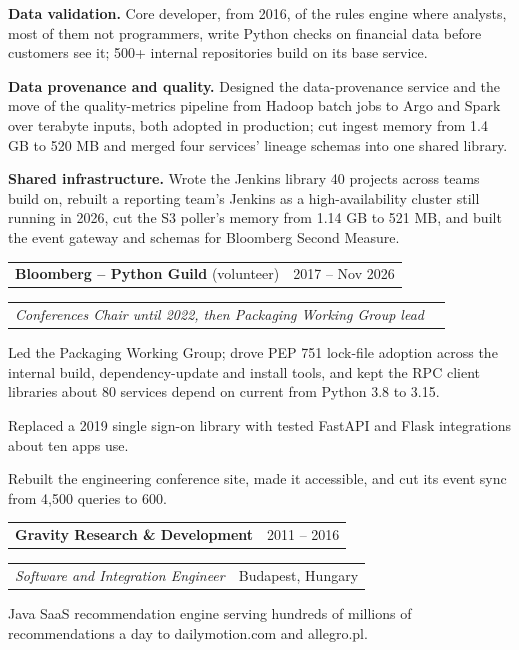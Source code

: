 \documentclass[10pt]{article}
\makeatletter
\newcommand{\entry}{\needspace{6\baselineskip}}
\newcommand{\twoColumns}[2]{%
  \noindent
  \begin{tabularx}{\textwidth}{@{}X r@{}}#2 & {\color{muted}#1}\\
  \end{tabularx}\par
}
\newcommand{\localsep}{\par}
\makeatother
\begin{document}
\begin{points}
\item \textbf{Data validation.} Core developer, from 2016, of the rules engine where analysts, most of them not
  programmers, write Python checks on financial data before customers see it; 500+ internal repositories build on its
  base service.
\item \textbf{Data provenance and quality.} Designed the data-provenance service and the move of the quality-metrics
  pipeline from Hadoop batch jobs to Argo and Spark over terabyte inputs, both adopted in production; cut ingest memory
  from 1.4 GB to 520 MB and merged four services' lineage schemas into one shared library.
\item \textbf{Shared infrastructure.} Wrote the Jenkins library 40 projects across teams build on, rebuilt a
  reporting team's Jenkins as a high-availability cluster still running in 2026, cut the S3 poller's memory from
  1.14 GB to 521 MB, and built the event gateway and schemas for Bloomberg Second Measure.
\end{points}

\localsep%
\vspace{4pt}

%
\twoColumns{2017 -- Nov 2026}{ \textbf{Bloomberg -- Python Guild} (volunteer) }
\twoColumns{}{ \emph{Conferences Chair until 2022, then Packaging Working Group lead} }

\begin{points}
\item Led the Packaging Working Group; drove PEP 751 lock-file adoption across the internal build,
  dependency-update and install tools, and kept the RPC client libraries about 80 services depend on current from
  Python 3.8 to 3.15.
\item Replaced a 2019 single sign-on library with tested FastAPI and Flask integrations about ten apps use.
\item Rebuilt the engineering conference site, made it accessible, and cut its event sync from 4{,}500 queries
  to 600.
\end{points}

\localsep%
\vspace{4pt}

\entry%
\twoColumns{2011 -- 2016}{ \textbf{Gravity Research \& Development} }
\twoColumns{Budapest, Hungary}{ \emph{Software and Integration Engineer} }

Java SaaS recommendation engine serving hundreds of millions of recommendations a day to
dailymotion\@.com and allegro\@.pl.
\end{document}
